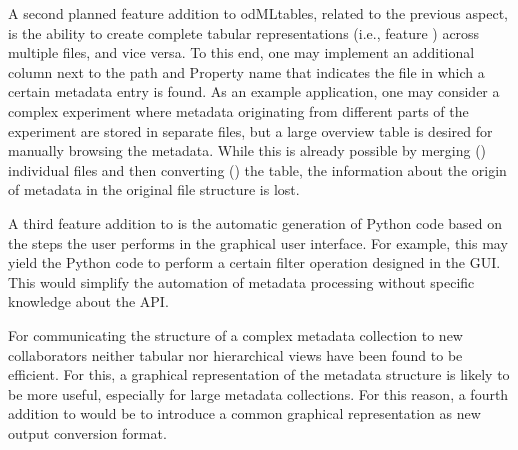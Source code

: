 A second planned feature addition to odMLtables, related to the previous aspect, is the ability to create complete tabular representations (i.e., feature \fconvert) across multiple  files, and vice versa. To this end, one may implement an additional column next to the  path and Property name that indicates the file in which a certain metadata entry is found. As an example application, one may consider a complex experiment where metadata originating from different parts of the experiment are stored in separate  files, but a large overview table is desired for manually browsing the metadata. While this is already possible by merging (\fmerge) individual files and then converting (\fconvert) the table, the information about the origin of metadata in the original file structure is lost.

A third feature addition to  is the automatic generation of Python code based on the steps the user performs in the graphical user interface. For example, this may yield the Python code to perform a certain filter operation designed in the GUI. This would simplify the automation of metadata processing without specific knowledge about the  API.

For communicating the structure of a complex metadata collection to new collaborators neither tabular nor hierarchical views have been found to be efficient. For this, a graphical representation of the metadata structure is likely to be more useful, especially for large metadata collections. For this reason, a fourth addition to  would be to introduce a common graphical representation as new output conversion format.

